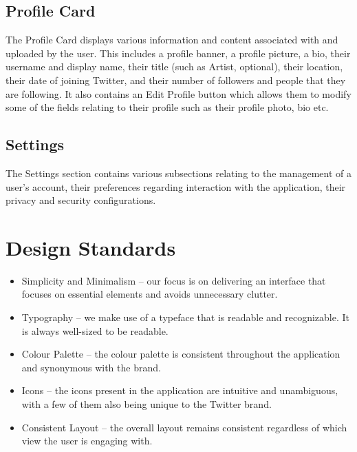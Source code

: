 \documentclass{article}
\begin{document}
\subsection{Profile Card}
The Profile Card displays various information and content associated with and uploaded by the user. This includes a profile banner, a profile picture, a bio, their username and display name, their title (such as Artist, optional), their location, their date of joining Twitter, and their number of followers and people that they are following. It also contains an Edit Profile button which allows them to modify some of the fields relating to their profile such as their profile photo, bio etc.

\subsection{Settings}
The Settings section contains various subsections relating to the management of a user’s account, their preferences regarding interaction with the application, their privacy and security configurations.

\section{Design Standards}
\begin{itemize}
    \item Simplicity and Minimalism – our focus is on delivering an interface that focuses on essential elements and avoids unnecessary clutter.
    \item Typography – we make use of a typeface that is readable and recognizable. It is always well-sized to be readable.
    \item Colour Palette – the colour palette is consistent throughout the application and synonymous with the brand.
    \item Icons – the icons present in the application are intuitive and unambiguous, with a few of them also being unique to the Twitter brand.
    \item Consistent Layout – the overall layout remains consistent regardless of which view the user is engaging with.
\end{itemize}
\end{document}
